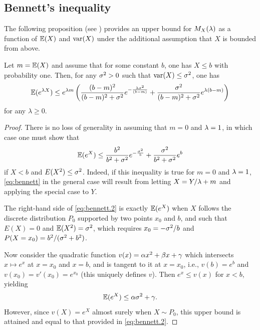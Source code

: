 \subsection{Bennett's inequality}
The following proposition (see \citep{bennett1962probability}) provides an upper bound for $M_X(\lambda)$ as a function of $\bm{\mathbb E}(X)$ and $\mathrm{var}(X)$ under the additional assumption that $X$ is bounded from above.
\begin{proposition}
\label{prop:bennett}
Let $m = \bm{\mathbb E}(X)$ and assume that for some constant $b$, one has  $X\leq b$ with probability one. Then, for any $\sigma^2>0$ such that $\mathrm{var}(X) \leq \sigma^2$, one has
\begin{equation}
\label{eq:bennett}
\bm{\mathbb E}(e^{\lambda X}) \leq e^{\lambda m} \left(\frac{(b-m)^2}{(b-m)^2 + \sigma^2} e^{- \frac{\lambda\sigma^2}{(b-m)}} + \frac{\sigma^2}{(b-m)^2+\sigma^2} e^{\lambda(b-m)}\right)
\end{equation}
for any $\lambda\geq 0$.
\end{proposition}
\begin{proof}
There is no loss of generality in assuming that $m=0$ and $\lambda = 1$, in which case one must show that 
\begin{equation}
\label{eq:bennett.2}
\bm{\mathbb E}(e^{X}) \leq \frac{b^2}{b^2 + \sigma^2} e^{- \frac{\sigma^2}{b}} + \frac{\sigma^2}{b^2+\sigma^2} e^{b}
\end{equation}
if $X<b$ and $E(X^2) \leq \sigma^2$.
Indeed, if this inequality is true for $m=0$ and $\lambda=1$, \eqref{eq:bennett} in the general case will result from letting $X = Y/\lambda + m$ and applying the special case to $Y$.


The right-hand side of \eqref{eq:bennett.2} is exactly $\bm{\mathbb E}(e^X)$ when $X$ follows the discrete distribution $P_0$ supported by two points $x_0$ and $b$, and such that  $E(X)=0$ and $\bm{\mathbb E}(X^2) = \sigma^2$, which requires $x_0 = -\sigma^2/b$ and $P(X=x_0) = b^2/(\sigma^2 + b^2)$.

Now consider the quadratic function $v(x) = \alpha x^2 + \beta x + \gamma$ which intersects $x\mapsto e^x$ at $x=x_0$ and $x=b$, and is tangent to it at $x=x_0$, i.e.,  $v(b) = e^b$ and $v(x_0) = v'(x_0) = e^{x_0}$ (this uniquely defines $v$). Then $e^x \leq v(x)$ for $x<b$, yielding
\[
\bm{\mathbb E}(e^X) \leq \alpha\sigma^2 + \gamma.
\]
However, since $v(X) = e^X$ almost surely when $X\sim P_0$,  this upper bound is  attained and equal to that provided in \eqref{eq:bennett.2}.
\end{proof}

